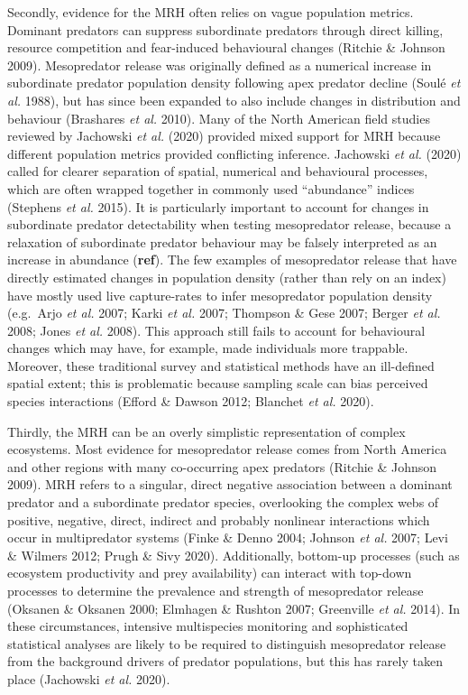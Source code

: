 \documentclass[11pt,a4paper,titlepage,twoside,openright]{style/unimelbthesis}
\begin{document}
\begin{mainmatter}
Secondly, evidence for the MRH often relies on vague population metrics. Dominant predators can suppress subordinate predators through direct killing, resource competition and fear-induced behavioural changes (Ritchie \& Johnson 2009). Mesopredator release was originally defined as a numerical increase in subordinate predator population density following apex predator decline (Soulé \emph{et al.} 1988), but has since been expanded to also include changes in distribution and behaviour (Brashares \emph{et al.} 2010). Many of the North American field studies reviewed by Jachowski \emph{et al.} (2020) provided mixed support for MRH because different population metrics provided conflicting inference. Jachowski \emph{et al.} (2020) called for clearer separation of spatial, numerical and behavioural processes, which are often wrapped together in commonly used ``abundance'' indices (Stephens \emph{et al.} 2015). It is particularly important to account for changes in subordinate predator detectability when testing mesopredator release, because a relaxation of subordinate predator behaviour may be falsely interpreted as an increase in abundance (\textbf{ref}). The few examples of mesopredator release that have directly estimated changes in population density (rather than rely on an index) have mostly used live capture-rates to infer mesopredator population density (e.g.~Arjo \emph{et al.} 2007; Karki \emph{et al.} 2007; Thompson \& Gese 2007; Berger \emph{et al.} 2008; Jones \emph{et al.} 2008). This approach still fails to account for behavioural changes which may have, for example, made individuals more trappable. Moreover, these traditional survey and statistical methods have an ill-defined spatial extent; this is problematic because sampling scale can bias perceived species interactions (Efford \& Dawson 2012; Blanchet \emph{et al.} 2020).

Thirdly, the MRH can be an overly simplistic representation of complex ecosystems. Most evidence for mesopredator release comes from North America and other regions with many co-occurring apex predators (Ritchie \& Johnson 2009). MRH refers to a singular, direct negative association between a dominant predator and a subordinate predator species, overlooking the complex webs of positive, negative, direct, indirect and probably nonlinear interactions which occur in multipredator systems (Finke \& Denno 2004; Johnson \emph{et al.} 2007; Levi \& Wilmers 2012; Prugh \& Sivy 2020). Additionally, bottom-up processes (such as ecosystem productivity and prey availability) can interact with top-down processes to determine the prevalence and strength of mesopredator release (Oksanen \& Oksanen 2000; Elmhagen \& Rushton 2007; Greenville \emph{et al.} 2014). In these circumstances, intensive multispecies monitoring and sophisticated statistical analyses are likely to be required to distinguish mesopredator release from the background drivers of predator populations, but this has rarely taken place (Jachowski \emph{et al.} 2020).


\end{mainmatter}
\end{document}
